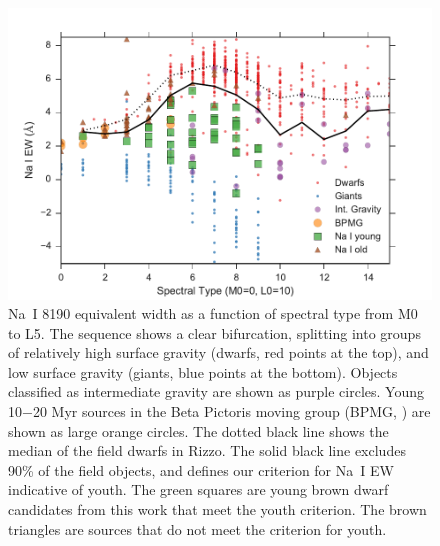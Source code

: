 \begin{figure}[ht!]
  \caption{Na~I 8190 equivalent width as a function of spectral type from M0 to L5.  The sequence shows a clear bifurcation, splitting into groups of relatively high surface gravity (dwarfs, red points at the top), and low surface gravity (giants, blue points at the bottom).  Objects classified as intermediate gravity \citep{2009AJ....137.3345C} are shown as purple circles.  Young 10$-$20 Myr sources in the Beta Pictoris moving group (BPMG, \citet{2012AJ....143..114S}) are shown as large orange circles.  The dotted black line shows the median of the field dwarfs in Rizzo.  The solid black line excludes 90\% of the field objects, and defines our criterion for Na~I EW indicative of youth.  The green squares are young brown dwarf candidates from this work that meet the youth criterion.  The brown triangles are sources that do not meet the criterion for youth.\label{fig_NaI_EW} }
\centering
\includegraphics[scale=0.6]{chIMACS/figures/NaI_EW}
\end{figure}


